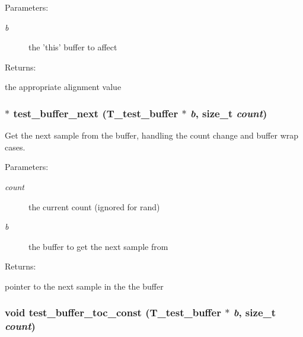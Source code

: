 \begin{Desc}
\item[Parameters: ]\par
\begin{description}
\item[{\em 
b}]the 'this' buffer to affect \end{description}
\end{Desc}
\begin{Desc}
\item[Returns: ]\par
the appropriate alignment value \end{Desc}
\subsubsection{$\ast$ test\_\-buffer\_\-next ({\bf T\_\-test\_\-buffer} $\ast$ {\em b}, size\_\-t {\em count})}\label{group__test__buffer_a10}


Get the next sample from the buffer, handling the count change and buffer wrap cases.

\begin{Desc}
\item[Parameters: ]\par
\begin{description}
\item[{\em 
count}]the current count (ignored for rand) \item[{\em 
b}]the buffer to get the next sample from \end{description}
\end{Desc}
\begin{Desc}
\item[Returns: ]\par
pointer to the next sample in the the buffer \end{Desc}
\subsubsection{\setlength{\rightskip}{0pt plus 5cm}void test\_\-buffer\_\-toc\_\-const ({\bf T\_\-test\_\-buffer} $\ast$ {\em b}, size\_\-t {\em count})}\label{group__test__buffer_a1}


